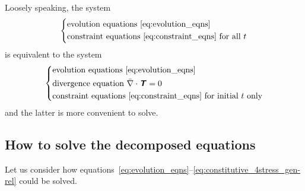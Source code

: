 \documentclass[\ifafour a4paper,12pt,\else a5paper,10pt,\fi%
onecolumn,oneside,article,%
british%
]{memoir}
\theoremstyle{remark}
\theoremstyle{innote}
\newcommand*{\mathte}[1]{\textbf{\textit{\textsf{#1}}}}
\newcommand*{\incr}{\triangle}%
\renewcommand*{\|}{\nonscript\,\vert\nonscript\;\mathopen{}}
\newcommand*{\ydd}{m}
\newcommand*{\yd}{\ydd}
\newcommand*{\yTT}{\tau}
\newcommand*{\yT}{\bm{\yTT}}
\newcommand*{\yTTf}{T}
\newcommand*{\yTf}{\mathte{\yTTf}}
\newcommand*{\ygg}{g}
\newcommand*{\yg}{\mathte{\ygg}}
\newcommand*{\yKK}{K}
\newcommand*{\yK}{\mathte{\yKK}}
\newcommand*{\ypp}{j}
\newcommand*{\yp}{\bm{\ypp}}
\newcommand*{\ye}{\epsilon}
\newcommand*{\ynaf}{\Bar{\nabla}}
\begin{document}
Loosely speaking, the system
\begin{equation*}
  \left\{\begin{aligned}
  &\text{evolution equations~\eqref{eq:evolution_eqns}} \\
  &\text{constraint equations~\eqref{eq:constraint_eqns} for all $t$}
  \end{aligned}\right.
\end{equation*}
is equivalent to the system
\begin{equation*}
  \left\{\begin{aligned}
  &\text{evolution equations~\eqref{eq:evolution_eqns}} \\
  &\text{divergence equation $\ynaf\cdot\yTf = 0$} \\
  &\text{constraint equations~\eqref{eq:constraint_eqns} for initial $t$ only}
  \end{aligned}\right.
\end{equation*}
and the latter is more convenient to solve.


\subsection{How to solve the decomposed equations}
\label{sec:how_to_solve_3-1}

Let us consider how
equations~\eqref{eq:evolution_eqns}--\eqref{eq:constitutive_4stress_gen-rel}
could be solved.


\end{document}
